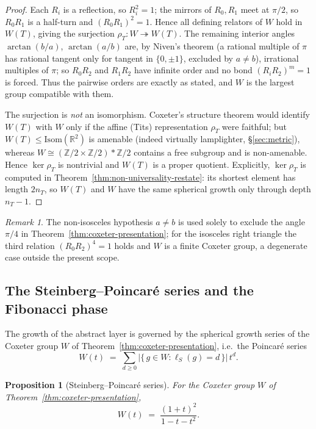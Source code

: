 \documentclass[11pt]{article}
\theoremstyle{plain}
\newtheorem{proposition}[theorem]{Proposition}
\theoremstyle{definition}
\theoremstyle{remark}
\newtheorem{remark}[theorem]{Remark}
\begin{document}
\begin{proof}
Each $R_i$ is a reflection, so $R_i^2 = 1$; the mirrors of $R_0,R_1$ meet at $\pi/2$, so $R_0R_1$ is a half-turn and $(R_0R_1)^2 = 1$. Hence all defining relators of $W$ hold in $W(T)$, giving the surjection $\rho_T\colon W \twoheadrightarrow W(T)$. The remaining interior angles $\arctan(b/a)$, $\arctan(a/b)$ are, by Niven's theorem (a rational multiple of $\pi$ has rational tangent only for tangent in $\{0,\pm1\}$, excluded by $a\ne b$), irrational multiples of $\pi$; so $R_0R_2$ and $R_1R_2$ have infinite order and no bond $(R_iR_2)^m=1$ is forced. Thus the pairwise orders are exactly as stated, and $W$ is the largest group compatible with them.

The surjection is \emph{not} an isomorphism. Coxeter's structure theorem would identify $W(T)$ with $W$ only if the affine (Tits) representation $\rho_T$ were faithful; but $W(T)\le\mathrm{Isom}(\mathbb{R}^2)$ is amenable (indeed virtually lamplighter, \S\ref{sec:metric}), whereas $W\cong(\mathbb{Z}/2\times\mathbb{Z}/2)*\mathbb{Z}/2$ contains a free subgroup \cite{Tits1972} and is non-amenable. Hence $\ker\rho_T$ is nontrivial and $W(T)$ is a proper quotient. Explicitly, $\ker\rho_T$ is computed in Theorem~\ref{thm:non-universality-restate}: its shortest element has length $2n_T$, so $W(T)$ and $W$ have the same spherical growth only through depth $n_T-1$.
\end{proof}

\begin{remark}
\label{rem:isosceles-excluded}
The non-isosceles hypothesis $a \neq b$ is used solely to exclude the angle $\pi/4$ in Theorem~\ref{thm:coxeter-presentation}; for the isosceles right triangle the third relation $(R_0 R_2)^4 = 1$ holds and $W$ is a finite Coxeter group, a degenerate case outside the present scope.
\end{remark}

\subsection{The Steinberg--Poincar\'e series and the Fibonacci phase}
\label{ssec:fibonacci-corollary}

The growth of the abstract layer is governed by the spherical growth series of the Coxeter group $W$ of Theorem~\ref{thm:coxeter-presentation}, i.e.\ the Poincar\'e series
\[
  W(t) \;=\; \sum_{d \ge 0} \bigl| \{\, g \in W : \ell_S(g) = d \,\} \bigr|\, t^d .
\]

\begin{proposition}[Steinberg--Poincar\'e series]
\label{prop:steinberg}
For the Coxeter group $W$ of Theorem~\ref{thm:coxeter-presentation},
\[
  W(t) \;=\; \frac{(1+t)^2}{1 - t - t^2}.
\]
\end{proposition}
\end{document}
